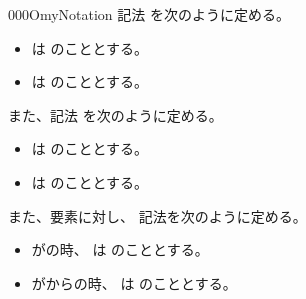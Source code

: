 \documentclass[index]{subfiles}
\begin{document}
\begin{myBlock}{000O}{myNotation}
  記法
  を次のように定める。
  \begin{itemize}
  \item \myInlineMath{\myRecordType{}}は
    \myInlineMath{\myUnitType}のこととする。
  \item {}は
    のこととする。
  \end{itemize}
  また、記法
  を次のように定める。
  \begin{itemize}
  \item \myInlineMath{\myRecordElem{}}は
    \myInlineMath{\myUnitElem}のこととする。
  \item {}は
    のこととする。
  \end{itemize}
  また、要素に対し、
  記法を次のように定める。
  \begin{itemize}
  \item {}がの時、
    は
    のこととする。
  \item {}がからの時、
    は
    のこととする。
  \end{itemize}
\end{myBlock}
\end{document}
